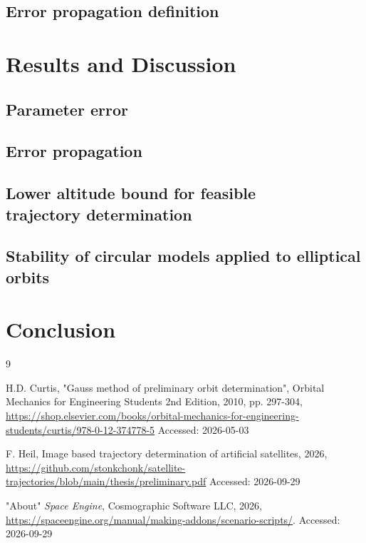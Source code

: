 \documentclass[10pt,a4paper]{article}
\begin{document}
	\subsection{Error propagation definition}\label{sec:error_propagation_definition}
	\section{Results and Discussion}\label{sec:results_discussion}
	\subsection{Parameter error}\label{sec:param_stability_result}
	\subsection{Error propagation}\label{sec:error_propagation_result}
	\subsection{Lower altitude bound for feasible \\ trajectory determination}\label{sec:lower_bound}
	\subsection{Stability of circular models applied to elliptical orbits}\label{sec:stability_circular}
	\section{Conclusion}\label{sec:conclusion}
	
	\onecolumn
	\begin{thebibliography}{9}
		\setlength{\itemsep}{4pt}       %
		\setlength{\parskip}{0pt}       %
		\setlength{\parsep}{0pt}        %
		
		H.D. Curtis, "Gauss method of preliminary orbit determination", Orbital Mechanics for Engineering Students 2nd Edition, 2010, pp. 297-304, \url{https://shop.elsevier.com/books/orbital-mechanics-for-engineering-students/curtis/978-0-12-374778-5}\newline
		Accessed: 2026-05-03
		
		F. Heil, Image based trajectory determination of artificial satellites, 2026, \newline \url{https://github.com/stonkchonk/satellite-trajectories/blob/main/thesis/preliminary.pdf}\newline
		Accessed: 2026-09-29
		
		"About" \emph{Space Engine}, Cosmographic Software LLC, 2026,\newline
		\url{https://spaceengine.org/manual/making-addons/scenario-scripts/}.\newline
		Accessed: 2026-09-29
	\end{thebibliography}
\end{document}
